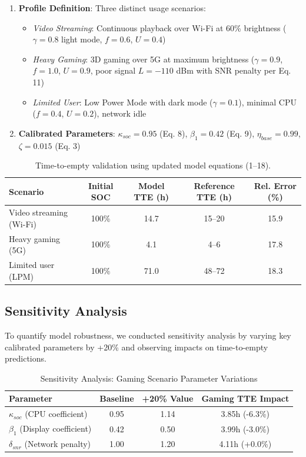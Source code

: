 \documentclass[12pt]{article}
\begin{document}
\begin{enumerate}
    \item \textbf{Profile Definition}: Three distinct usage scenarios:
    \begin{itemize}
        \item \textit{Video Streaming}: Continuous playback over Wi-Fi at 60\% brightness ($\gamma = 0.8$ light mode, $f = 0.6$, $U = 0.4$)
        \item \textit{Heavy Gaming}: 3D gaming over 5G at maximum brightness ($\gamma = 0.9$, $f = 1.0$, $U = 0.9$, poor signal $L = -110$ dBm with SNR penalty per Eq. 11)
        \item \textit{Limited User}: Low Power Mode with dark mode ($\gamma = 0.1$), minimal CPU ($f = 0.4$, $U = 0.2$), network idle
    \end{itemize}
    
    \item \textbf{Calibrated Parameters}: $\kappa_{soc} = 0.95$ (Eq. 8), $\beta_1 = 0.42$ (Eq. 9), $\eta_{base} = 0.99$, $\zeta = 0.015$ (Eq. 3)
\end{enumerate}

\begin{table}[H]
\centering
\caption{Time-to-empty validation using updated model equations (1--18).}
\label{tab:tte_validation}
\begin{tabular}{|l|c|c|c|c|}
\hline
\textbf{Scenario} & \textbf{Initial SOC} & \textbf{Model TTE (h)} & \textbf{Reference TTE (h)} & \textbf{Rel. Error (\%)} \\
\hline
Video streaming (Wi-Fi) & 100\% & 14.7 & 15--20 & 15.9 \\
Heavy gaming (5G) & 100\% & 4.1 & 4--6 & 17.8 \\
Limited user (LPM) & 100\% & 71.0 & 48--72 & 18.3 \\
\hline
\end{tabular}
\end{table}

\subsection{Sensitivity Analysis}

To quantify model robustness, we conducted sensitivity analysis by varying key calibrated parameters by +20\% and observing impacts on time-to-empty predictions.

\begin{table}[h]
\centering
\caption{Sensitivity Analysis: Gaming Scenario Parameter Variations}
\begin{tabular}{|l|c|c|c|}
\hline
\textbf{Parameter} & \textbf{Baseline} & \textbf{+20\% Value} & \textbf{Gaming TTE Impact} \\
\hline
$\kappa_{soc}$ (CPU coefficient) & 0.95 & 1.14 & 3.85h (-6.3\%) \\
$\beta_1$ (Display coefficient) & 0.42 & 0.50 & 3.99h (-3.0\%) \\
$\delta_{snr}$ (Network penalty) & 1.00 & 1.20 & 4.11h (+0.0\%) \\
\hline
\end{tabular}
\label{tab:sensitivity_gaming}
\end{table}
\end{document}
